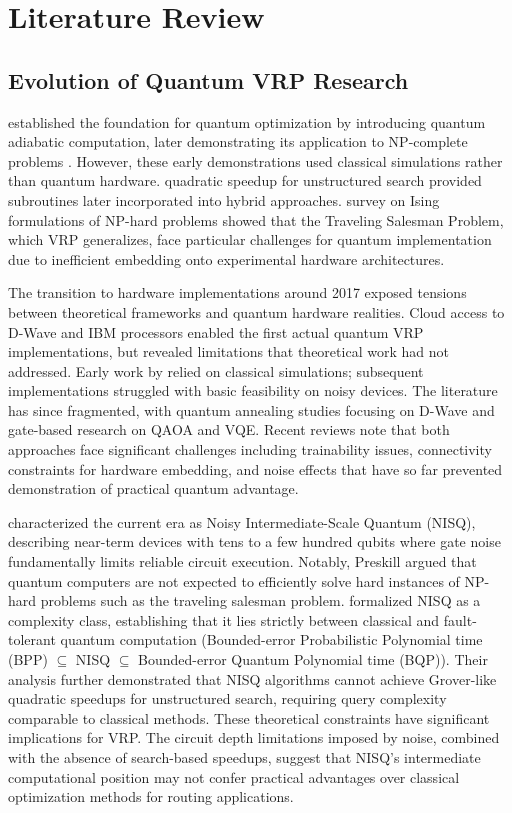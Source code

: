 \documentclass[preprint,3p,12pt,authoryear]{elsarticle}
\begin{document}
\section{Literature Review}\label{sec:literature}

\subsection{Evolution of Quantum VRP Research}

\citet{farhi2000quantum} established the foundation for quantum optimization by introducing quantum adiabatic computation, later demonstrating its application to NP-complete problems \citep{farhi2001quantum}. However, these early demonstrations used classical simulations rather than quantum hardware. \citet{grover1996quantum} quadratic speedup for unstructured search provided subroutines later incorporated into hybrid approaches. \citet{lucas2014ising} survey on Ising formulations of NP-hard problems showed that the Traveling Salesman Problem, which VRP generalizes, face particular challenges for quantum implementation due to inefficient embedding onto experimental hardware architectures.

The transition to hardware implementations around 2017 exposed tensions between theoretical frameworks and quantum hardware realities. Cloud access to D-Wave and IBM processors enabled the first actual quantum VRP implementations, but revealed limitations that theoretical work had not addressed. Early work by \citet{crispin2013quantum} relied on classical simulations; subsequent implementations struggled with basic feasibility on noisy devices. The literature has since fragmented, with quantum annealing studies focusing on D-Wave and gate-based research on QAOA and VQE. Recent reviews \citep{cerezo2021variational, bharti2022noisy} note that both approaches face significant challenges including trainability issues, connectivity constraints for hardware embedding, and noise effects that have so far prevented demonstration of practical quantum advantage.

\citet{preskill2018quantum} characterized the current era as Noisy Intermediate-Scale Quantum (NISQ), describing near-term devices with tens to a few hundred qubits where gate noise fundamentally limits reliable circuit execution. Notably, Preskill argued that quantum computers are not expected to efficiently solve hard instances of NP-hard problems such as the traveling salesman problem. \citet{chen2023complexity} formalized NISQ as a complexity class, establishing that it lies strictly between classical and fault-tolerant quantum computation (Bounded-error Probabilistic Polynomial time (BPP) $\subseteq$ NISQ $\subseteq$ Bounded-error Quantum Polynomial time (BQP)). Their analysis further demonstrated that NISQ algorithms cannot achieve Grover-like quadratic speedups for unstructured search, requiring query complexity comparable to classical methods. These theoretical constraints have significant implications for VRP. The circuit depth limitations imposed by noise, combined with the absence of search-based speedups, suggest that NISQ's intermediate computational position may not confer practical advantages over classical optimization methods for routing applications.
\end{document}
